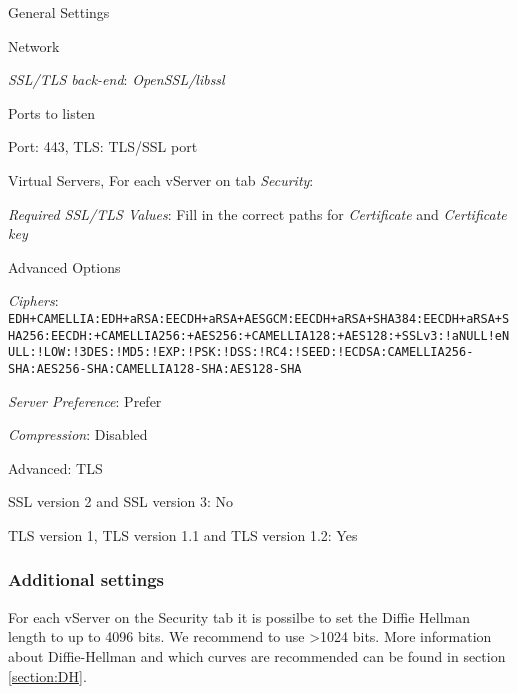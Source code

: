 \begin{itemize*}
    \item General Settings
    \begin{itemize*}
        \item Network
        \begin{itemize*}
            \item \emph{SSL/TLS back-end}: \emph{OpenSSL/libssl}
        \end{itemize*}
        \item Ports to listen
        \begin{itemize*}
            \item Port: 443, TLS: TLS/SSL port
        \end{itemize*}
    \end{itemize*}
    \item Virtual Servers, For each vServer on tab \emph{Security}:
    \begin{itemize*}
        \item \emph{Required SSL/TLS Values}: Fill in the correct paths for \emph{Certificate} and \emph{Certificate key}
        \item Advanced Options
        \begin{itemize*}
            \item \emph{Ciphers}: \texttt{EDH+CAMELLIA:EDH+aRSA:EECDH+aRSA+AESGCM:EECDH+aRSA+SHA384:\newline EECDH+aRSA+SHA256:EECDH:+CAMELLIA256:+AES256:+CAMELLIA128:+AES128:\newline+SSLv3:!aNULL!eNULL:!LOW:!3DES:!MD5:!EXP:!PSK:!DSS:!RC4:!SEED:\newline!ECDSA:CAMELLIA256-SHA:AES256-SHA:CAMELLIA128-SHA:AES128-SHA}
            \item \emph{Server Preference}: Prefer
            \item \emph{Compression}: Disabled
        \end{itemize*}
    \end{itemize*}
    \item Advanced: TLS
    \begin{itemize*}
        \item SSL version 2 and SSL version 3: No
        \item TLS version 1, TLS version 1.1 and TLS version 1.2: Yes
    \end{itemize*}
\end{itemize*}

\subsubsection{Additional settings}
For each vServer on the Security tab it is possilbe to set the Diffie Hellman length to up to 4096 bits. We recommend to use \textgreater 1024 bits.
More information about Diffie-Hellman and which curves are recommended can be found in section \ref{section:DH}.

